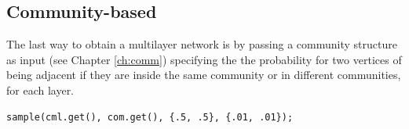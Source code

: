 \subsection{Community-based}

The last way to obtain a multilayer network is by passing a community structure as input (see Chapter \ref{ch:comm}) specifying the the probability for two vertices of being adjacent if they are inside the same community or in different communities, for each layer.
\begin{lstlisting}[style=c++]
sample(cml.get(), com.get(), {.5, .5}, {.01, .01});
\end{lstlisting}